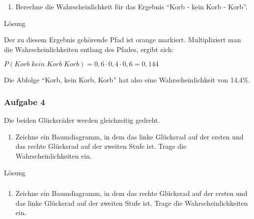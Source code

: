 \documentclass[
  ngerman,
]{book}
\providecommand{\tightlist}{%
  \setlength{\itemsep}{0pt}\setlength{\parskip}{0pt}}
\begin{document}
\begin{enumerate}
\def\labelenumi{\alph{enumi})}
\setcounter{enumi}{2}
\tightlist
\item
  Berechne die Wahrscheinlichkeit für das Ergebnis ``Korb - kein Korb - Korb''.
\end{enumerate}

Lösung

Der zu diesem Ergebnis gehörende Pfad ist orange markiert. Multipliziert man die Wahrscheinlichkeiten entlang des Pfades, ergibt sich:

\(P(Korb\;kein\;Korb\;Korb)=0,6\cdot0,4\cdot0,6=0,144\)

Die Abfolge ``Korb, kein Korb, Korb'' hat also eine Wahrscheinlichkeit von 14,4\%.

\hypertarget{section-120}{%
\subsubsection*{}\label{section-120}}

\hypertarget{aufgabe-4-3}{%
\subsubsection*{Aufgabe 4}\label{aufgabe-4-3}}

Die beiden Glücksräder werden gleichzeitig gedreht.

\begin{enumerate}
\def\labelenumi{\alph{enumi})}
\tightlist
\item
  Zeichne ein Baumdiagramm, in dem das linke Glücksrad auf der ersten und das rechte Glücksrad auf der zweiten Stufe ist. Trage die Wahrscheinlichkeiten ein.
\end{enumerate}

Lösung

\hypertarget{section-121}{%
\subsubsection*{}\label{section-121}}

\begin{enumerate}
\def\labelenumi{\alph{enumi})}
\setcounter{enumi}{1}
\tightlist
\item
  Zeichne ein Baumdiagramm, in dem das rechte Glücksrad auf der ersten und das linke Glücksrad auf der zweiten Stufe ist. Trage die Wahrscheinlichkeiten ein.
\end{enumerate}
\end{document}
